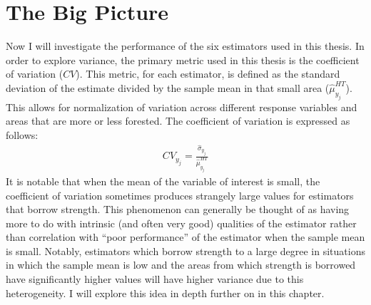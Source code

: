\documentclass[12pt,twoside]{reedthesis}
\begin{document}
\hypertarget{the-big-picture}{%
\section{The Big Picture}\label{the-big-picture}}

Now I will investigate the performance of the six estimators used in this thesis. In order to explore variance, the primary metric used in this thesis is the coefficient of variation (\(CV\)). This metric, for each estimator, is defined as the standard deviation of the estimate divided by the sample mean in that small area (\(\hat \mu_{y_j}^{HT}\)). This allows for normalization of variation across different response variables and areas that are more or less forested. The coefficient of variation is expressed as follows:
\begin{align}
CV_{y_j} = \frac{\hat\sigma_{y_j}}{\hat\mu_{y_j}^{HT}}
\end{align}
It is notable that when the mean of the variable of interest is small, the coefficient of variation sometimes produces strangely large values for estimators that borrow strength. This phenomenon can generally be thought of as having more to do with intrinsic (and often very good) qualities of the estimator rather than correlation with ``poor performance'' of the estimator when the sample mean is small. Notably, estimators which borrow strength to a large degree in situations in which the sample mean is low and the areas from which strength is borrowed have significantly higher values will have higher variance due to this heterogeneity. I will explore this idea in depth further on in this chapter.
\end{document}
